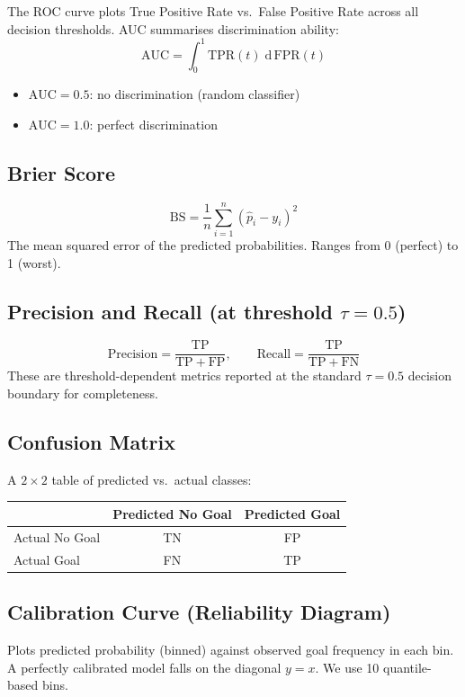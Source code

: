 \documentclass[11pt,a4paper]{article}
\begin{document}
The ROC curve plots True Positive Rate vs.\ False Positive Rate across
all decision thresholds.  AUC summarises discrimination ability:
\[
  \mathrm{AUC} = \int_0^1 \mathrm{TPR}(t)\;\mathrm{d}\,\mathrm{FPR}(t)
\]
\begin{itemize}[nosep]
  \item $\mathrm{AUC} = 0.5$: no discrimination (random classifier)
  \item $\mathrm{AUC} = 1.0$: perfect discrimination
\end{itemize}

\subsection{Brier Score}
\[
  \mathrm{BS} = \frac{1}{n}\sum_{i=1}^{n}(\hat{p}_i - y_i)^2
\]
The mean squared error of the predicted probabilities.
Ranges from 0 (perfect) to 1 (worst).

\subsection{Precision and Recall (at threshold $\tau = 0.5$)}
\[
  \text{Precision} = \frac{\mathrm{TP}}{\mathrm{TP} + \mathrm{FP}},
  \qquad
  \text{Recall} = \frac{\mathrm{TP}}{\mathrm{TP} + \mathrm{FN}}
\]
These are threshold-dependent metrics reported at the standard $\tau=0.5$
decision boundary for completeness.

\subsection{Confusion Matrix}

A $2 \times 2$ table of predicted vs.\ actual classes:

\begin{center}
\begin{tabular}{l|cc}
             & Predicted No Goal & Predicted Goal \\ \hline
  Actual No Goal & TN & FP \\
  Actual Goal    & FN & TP \\
\end{tabular}
\end{center}

\subsection{Calibration Curve (Reliability Diagram)}

Plots predicted probability (binned) against observed goal frequency in
each bin.  A perfectly calibrated model falls on the diagonal $y = x$.
We use 10 quantile-based bins.
\end{document}
